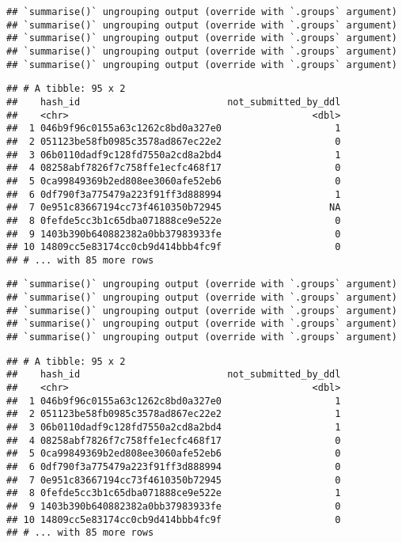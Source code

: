 \documentclass[
]{article}
\begin{document}
\begin{verbatim}
## `summarise()` ungrouping output (override with `.groups` argument)
## `summarise()` ungrouping output (override with `.groups` argument)
## `summarise()` ungrouping output (override with `.groups` argument)
## `summarise()` ungrouping output (override with `.groups` argument)
## `summarise()` ungrouping output (override with `.groups` argument)
\end{verbatim}

\begin{verbatim}
## # A tibble: 95 x 2
##    hash_id                          not_submitted_by_ddl
##    <chr>                                           <dbl>
##  1 046b9f96c0155a63c1262c8bd0a327e0                    1
##  2 051123be58fb0985c3578ad867ec22e2                    0
##  3 06b0110dadf9c128fd7550a2cd8a2bd4                    1
##  4 08258abf7826f7c758ffe1ecfc468f17                    0
##  5 0ca99849369b2ed808ee3060afe52eb6                    0
##  6 0df790f3a775479a223f91ff3d888994                    1
##  7 0e951c83667194cc73f4610350b72945                   NA
##  8 0fefde5cc3b1c65dba071888ce9e522e                    0
##  9 1403b390b640882382a0bb37983933fe                    0
## 10 14809cc5e83174cc0cb9d414bbb4fc9f                    0
## # ... with 85 more rows
\end{verbatim}

\begin{verbatim}
## `summarise()` ungrouping output (override with `.groups` argument)
## `summarise()` ungrouping output (override with `.groups` argument)
## `summarise()` ungrouping output (override with `.groups` argument)
## `summarise()` ungrouping output (override with `.groups` argument)
## `summarise()` ungrouping output (override with `.groups` argument)
\end{verbatim}

\begin{verbatim}
## # A tibble: 95 x 2
##    hash_id                          not_submitted_by_ddl
##    <chr>                                           <dbl>
##  1 046b9f96c0155a63c1262c8bd0a327e0                    1
##  2 051123be58fb0985c3578ad867ec22e2                    1
##  3 06b0110dadf9c128fd7550a2cd8a2bd4                    1
##  4 08258abf7826f7c758ffe1ecfc468f17                    0
##  5 0ca99849369b2ed808ee3060afe52eb6                    0
##  6 0df790f3a775479a223f91ff3d888994                    0
##  7 0e951c83667194cc73f4610350b72945                    0
##  8 0fefde5cc3b1c65dba071888ce9e522e                    1
##  9 1403b390b640882382a0bb37983933fe                    0
## 10 14809cc5e83174cc0cb9d414bbb4fc9f                    0
## # ... with 85 more rows
\end{verbatim}
\end{document}
